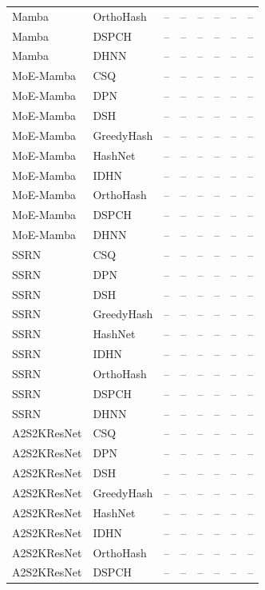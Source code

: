 \begin{longtable}{llrrrrrr}
Mamba & OrthoHash & -- & -- & -- & -- & -- & -- \\
Mamba & DSPCH & -- & -- & -- & -- & -- & -- \\
Mamba & DHNN & -- & -- & -- & -- & -- & -- \\
\addlinespace
MoE-Mamba & CSQ & -- & -- & -- & -- & -- & -- \\
MoE-Mamba & DPN & -- & -- & -- & -- & -- & -- \\
MoE-Mamba & DSH & -- & -- & -- & -- & -- & -- \\
MoE-Mamba & GreedyHash & -- & -- & -- & -- & -- & -- \\
MoE-Mamba & HashNet & -- & -- & -- & -- & -- & -- \\
MoE-Mamba & IDHN & -- & -- & -- & -- & -- & -- \\
MoE-Mamba & OrthoHash & -- & -- & -- & -- & -- & -- \\
MoE-Mamba & DSPCH & -- & -- & -- & -- & -- & -- \\
MoE-Mamba & DHNN & -- & -- & -- & -- & -- & -- \\
\addlinespace
SSRN & CSQ & -- & -- & -- & -- & -- & -- \\
SSRN & DPN & -- & -- & -- & -- & -- & -- \\
SSRN & DSH & -- & -- & -- & -- & -- & -- \\
SSRN & GreedyHash & -- & -- & -- & -- & -- & -- \\
SSRN & HashNet & -- & -- & -- & -- & -- & -- \\
SSRN & IDHN & -- & -- & -- & -- & -- & -- \\
SSRN & OrthoHash & -- & -- & -- & -- & -- & -- \\
SSRN & DSPCH & -- & -- & -- & -- & -- & -- \\
SSRN & DHNN & -- & -- & -- & -- & -- & -- \\
\addlinespace
A2S2KResNet & CSQ & -- & -- & -- & -- & -- & -- \\
A2S2KResNet & DPN & -- & -- & -- & -- & -- & -- \\
A2S2KResNet & DSH & -- & -- & -- & -- & -- & -- \\
A2S2KResNet & GreedyHash & -- & -- & -- & -- & -- & -- \\
A2S2KResNet & HashNet & -- & -- & -- & -- & -- & -- \\
A2S2KResNet & IDHN & -- & -- & -- & -- & -- & -- \\
A2S2KResNet & OrthoHash & -- & -- & -- & -- & -- & -- \\
A2S2KResNet & DSPCH & -- & -- & -- & -- & -- & -- \\

\end{longtable}
